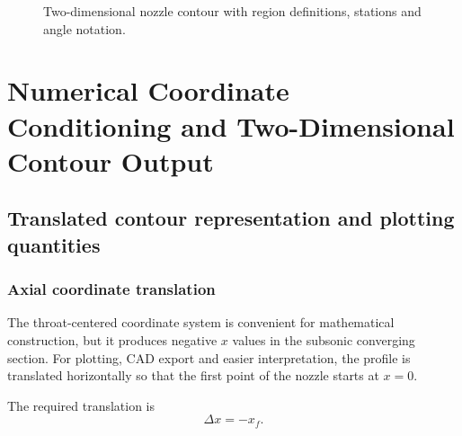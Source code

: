 \documentclass[11pt,a4paper]{article}
\begin{document}
\begin{figure}[H]
\caption{Two-dimensional nozzle contour with region definitions, stations and angle notation.}
\label{fig:nozzle_piecewise_tikz}
\end{figure}

\section{Numerical Coordinate Conditioning and Two-Dimensional Contour Output}

\subsection{Translated contour representation and plotting quantities}

\subsubsection{Axial coordinate translation}

The throat-centered coordinate system is convenient for mathematical construction, but it produces negative $x$ values in the subsonic converging section. For plotting, CAD export and easier interpretation, the profile is translated horizontally so that the first point of the nozzle starts at $x=0$.

The required translation is
\begin{equation}
\Delta x=-x_f.
\label{eq:translation_simple}
\end{equation}
\end{document}
